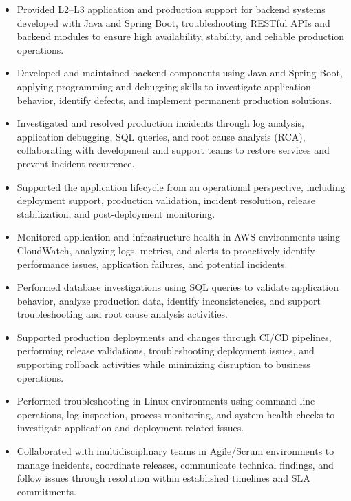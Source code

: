 \documentclass[10pt,letterpaper]{article}
\begin{document}
\begin{itemize}

    \item Provided L2--L3 application and production support for backend systems developed with Java and Spring Boot, troubleshooting RESTful APIs and backend modules to ensure high availability, stability, and reliable production operations.

    \item Developed and maintained backend components using Java and Spring Boot, applying programming and debugging skills to investigate application behavior, identify defects, and implement permanent production solutions.

    \item Investigated and resolved production incidents through log analysis, application debugging, SQL queries, and root cause analysis (RCA), collaborating with development and support teams to restore services and prevent incident recurrence.

    \item Supported the application lifecycle from an operational perspective, including deployment support, production validation, incident resolution, release stabilization, and post-deployment monitoring.

    \item Monitored application and infrastructure health in AWS environments using CloudWatch, analyzing logs, metrics, and alerts to proactively identify performance issues, application failures, and potential incidents.

    \item Performed database investigations using SQL queries to validate application behavior, analyze production data, identify inconsistencies, and support troubleshooting and root cause analysis activities.

    \item Supported production deployments and changes through CI/CD pipelines, performing release validations, troubleshooting deployment issues, and supporting rollback activities while minimizing disruption to business operations.

    \item Performed troubleshooting in Linux environments using command-line operations, log inspection, process monitoring, and system health checks to investigate application and deployment-related issues.

    \item Collaborated with multidisciplinary teams in Agile/Scrum environments to manage incidents, coordinate releases, communicate technical findings, and follow issues through resolution within established timelines and SLA commitments.


\end{itemize}
\end{document}
